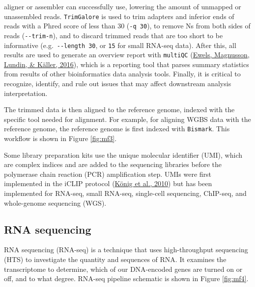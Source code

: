 \documentclass[12pt,twoside]{reedthesis}
\begin{document}
aligner or assembler can successfully use, lowering the amount of
unmapped or unassembled reads. \texttt{TrimGalore} is used to trim adapters and
inferior ends of reads with a Phred score of less than 30 (\texttt{-q\ 30}), to
remove Ns from both sides of reads (\texttt{-\/-trim-n}), and to discard trimmed
reads that are too short to be informative (e.g.~\texttt{-\/-length\ 30}, or \texttt{15}
for small RNA-seq data). After this, all results are used to generate an
overview report with \texttt{multiQC} (\protect\hyperlink{ref-ewels2016}{Ewels, Magnusson, Lundin, \& Käller, 2016}), which is a reporting tool
that parses summary statistics from results of other bioinformatics data
analysis tools. Finally, it is critical to recognize, identify, and rule
out issues that may affect downstream analysis interpretation.

The trimmed data is then aligned to the reference genome, indexed with
the specific tool needed for alignment. For example, for aligning WGBS
data with the reference genome, the reference genome is first indexed
with \texttt{Bismark}. This workflow is shown in Figure \ref{fig:mf3}.

Some library preparation kits use the unique molecular identifier (UMI),
which are complex indices and are added to the sequencing libraries
before the polymerase chain reaction (PCR) amplification step. UMIs were
first implemented in the iCLIP protocol (\protect\hyperlink{ref-kuxf6nig2010}{König et al., 2010}) but has been
implemented for RNA-seq, small RNA-seq, single-cell sequencing,
ChIP-seq, and whole-genome sequencing (WGS).

\hypertarget{m3.2}{%
\subsection*{RNA sequencing}\label{m3.2}}

RNA sequencing (RNA-seq) is a technique that uses high-throughput
sequencing (HTS) to investigate the quantity and sequences of RNA. It
examines the transcriptome to determine, which of our DNA-encoded genes
are turned on or off, and to what degree. RNA-seq pipeline schematic is
shown in Figure \ref{fig:mf4}.
\end{document}
